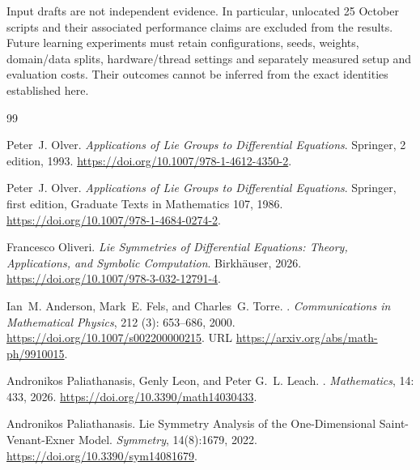 \documentclass[11pt,a4paper,oneside]{report}
\numberwithin{equation}{chapter}
\begin{document}
Input drafts are not independent evidence. In particular, unlocated
25 October scripts and their associated performance claims are excluded
from the results. Future learning experiments must retain configurations,
seeds, weights, domain/data splits, hardware/thread settings and separately
measured setup and evaluation costs. Their outcomes cannot be inferred from
the exact identities established here.

\clearpage
{}
\begingroup\small\singlespacing
\setlength{\bibsep}{3pt plus 1pt minus 1pt}
\begin{thebibliography}{99}
\providecommand{\natexlab}[1]{#1}
\newcommand{\doi}[1]{\url{https://doi.org/#1}}

Peter~J. Olver.
\newblock \emph{{Applications of Lie Groups to Differential Equations}}.
\newblock Springer, 2 edition, 1993.
\newblock \doi{10.1007/978-1-4612-4350-2}.

Peter~J. Olver.
\newblock \emph{Applications of Lie Groups to Differential Equations}.
\newblock Springer, first edition, Graduate Texts in Mathematics 107, 1986.
\newblock \doi{10.1007/978-1-4684-0274-2}.


Francesco Oliveri.
\newblock \emph{{Lie Symmetries of Differential Equations: Theory,
  Applications, and Symbolic Computation}}.
\newblock Birkh{\"a}user, 2026.
\newblock \doi{10.1007/978-3-032-12791-4}.

Ian~M. Anderson, Mark~E. Fels, and Charles~G. Torre.
.
\newblock \emph{Communications in Mathematical Physics}, 212
  (3): 653--686, 2000.
\newblock \doi{10.1007/s002200000215}.
\newblock URL \url{https://arxiv.org/abs/math-ph/9910015}.

Andronikos Paliathanasis, Genly Leon, and Peter G.~L. Leach.
.
\newblock \emph{Mathematics}, 14: 433, 2026.
\newblock \doi{10.3390/math14030433}.

Andronikos Paliathanasis.
\newblock Lie Symmetry Analysis of the One-Dimensional Saint-Venant-Exner Model.
\newblock \emph{Symmetry}, 14(8):1679, 2022.
\newblock \doi{10.3390/sym14081679}.


\end{thebibliography}
\end{document}
